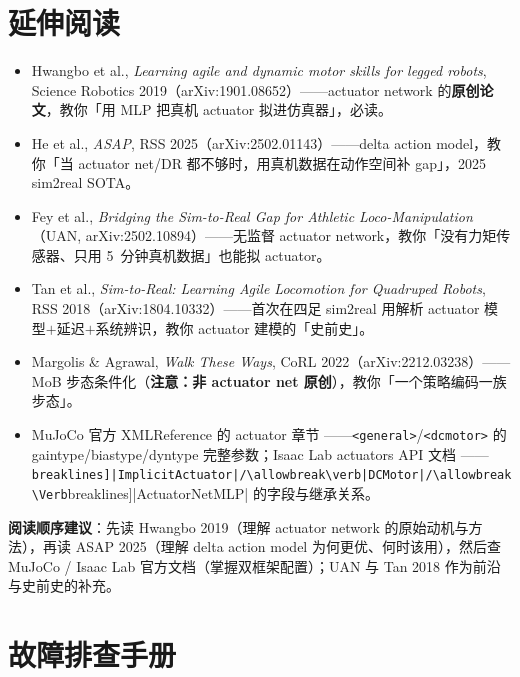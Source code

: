 \section*{延伸阅读}
\label{sec:rlmc-act-further}

\begin{itemize}
  \item Hwangbo et al., \emph{Learning agile and dynamic motor skills for legged robots}, Science Robotics 2019（arXiv:1901.08652）\cite{hwangbo2019}——actuator network 的\textbf{原创论文}，教你「用 MLP 把真机 actuator 拟进仿真器」，必读。
  \item He et al., \emph{ASAP}, RSS 2025（arXiv:2502.01143）\cite{he2025asap}——delta action model，教你「当 actuator net/DR 都不够时，用真机数据在动作空间补 gap」，2025 sim2real SOTA。
  \item Fey et al., \emph{Bridging the Sim-to-Real Gap for Athletic Loco-Manipulation}（UAN, arXiv:2502.10894）\cite{fey2025uan}——无监督 actuator network，教你「没有力矩传感器、只用 5~分钟真机数据」也能拟 actuator。
  \item Tan et al., \emph{Sim-to-Real: Learning Agile Locomotion for Quadruped Robots}, RSS 2018（arXiv:1804.10332）\cite{tan2018simtoreal}——首次在四足 sim2real 用解析 actuator 模型$+$延迟$+$系统辨识，教你 actuator 建模的「史前史」。
  \item Margolis \& Agrawal, \emph{Walk These Ways}, CoRL 2022（arXiv:2212.03238）\cite{margolis2022walk}——MoB 步态条件化（\textbf{注意：非 actuator net 原创}），教你「一个策略编码一族步态」。
  \item MuJoCo 官方 XMLReference 的 actuator 章节 \cite{todorov2012mujoco}——\verb|<general>|/\allowbreak\verb|<dcmotor>| 的 gaintype/biastype/dyntype 完整参数；Isaac Lab actuators API 文档 \cite{mittal2025isaaclab}——\Verb[breaklines]|ImplicitActuator|/\allowbreak\verb|DCMotor|/\allowbreak\Verb[breaklines]|ActuatorNetMLP| 的字段与继承关系。
\end{itemize}

\textbf{阅读顺序建议}：先读 Hwangbo 2019（理解 actuator network 的原始动机与方法），再读 ASAP 2025（理解 delta action model 为何更优、何时该用），然后查 MuJoCo / Isaac Lab 官方文档（掌握双框架配置）；UAN 与 Tan 2018 作为前沿与史前史的补充。

\section*{故障排查手册}
\label{sec:rlmc-act-troubleshoot}

